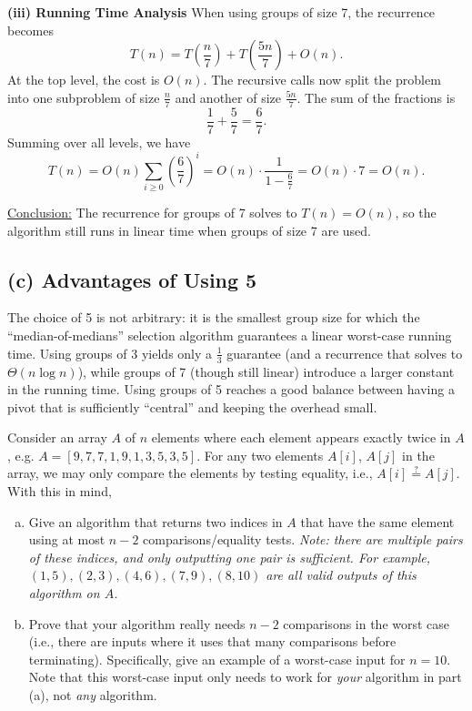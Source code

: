 \documentclass[11pt]{article}
\begin{document}
    \medskip
    
    \textbf{(iii) Running Time Analysis}  
    When using groups of size 7, the recurrence becomes
    \[
    T(n)= T\left(\frac{n}{7}\right) + T\left(\frac{5n}{7}\right) + O(n).
    \]
    \medskip
    At the top level, the cost is \(O(n)\). The recursive calls now split the problem into one subproblem of size \(\frac{n}{7}\) and another of size \(\frac{5n}{7}\). The sum of the fractions is
    \[
    \frac{1}{7} + \frac{5}{7} = \frac{6}{7}.
    \]
    \medskip
    Summing over all levels, we have
    \[
    T(n) = O(n) \sum_{i\ge 0}\left(\frac{6}{7}\right)^i = O(n) \cdot \frac{1}{1-\frac{6}{7}} = O(n) \cdot 7 = O(n).
    \]
    
    \medskip
    
    \underline{Conclusion:}  
    The recurrence for groups of 7 solves to \(T(n)=O(n)\), so the algorithm still runs in linear time when groups of size 7 are used.

    \bigskip
    
    \subsection*{(c) Advantages of Using 5}  
    The choice of 5 is not arbitrary: it is the smallest group size for which the “median-of-medians” selection algorithm guarantees a linear worst-case running time. Using groups of 3 yields only a \(\frac{1}{3}\) guarantee (and a recurrence that solves to \(\Theta(n\log n)\)), while groups of 7 (though still linear) introduce a larger constant in the running time. Using groups of 5 reaches a good balance between having a pivot that is sufficiently “central” and keeping the overhead small.
    
    \newpage
    \begin{tcolorbox}[title={Problem 2 (Finding Duplicates, 30 pts)}] \setlength\parindent{1em}
        Consider an array $A$ of $n$ elements where each element appears exactly twice in $A$, e.g. $A=[9, 7, 7, 1, 9, 1, 3, 5, 3, 5]$. For any two elements $A[i]$, $A[j]$ in the array, we may only compare the elements by testing equality, i.e., $A[i] \overset{?}{=} A[j]$. With this in mind,
        \begin{enumerate}[(a)]
            \item Give an algorithm that returns two indices in $A$ that have the same element using at most $n-2$ comparisons/equality tests. \emph{Note: there are multiple pairs of these indices, and only outputting one pair is sufficient. For example, $(1, 5), (2, 3), (4, 6), (7, 9), (8, 10)$ are all valid outputs of this algorithm on $A$.}
            \item Prove that your algorithm really needs $n-2$ comparisons in the worst case (i.e., there are inputs where it uses that many comparisons before terminating). Specifically, give an example of a worst-case input for $n = 10$. Note that this worst-case input only needs to work for \emph{your} algorithm in part (a), not \emph{any} algorithm.
        \end{enumerate}
    \end{tcolorbox}
\end{document}
